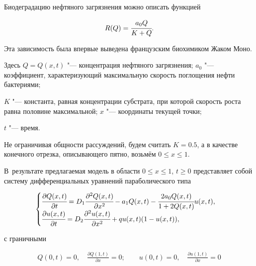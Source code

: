 Биодеградацию нефтяного загрязнения можно описать функцией  \cite[c.~18]{afa:bib9}

$$ R(Q) = \cfrac{a_0 Q}{K+Q}.$$ 

Эта зависимость была впервые выведена французским биохимиком Жаком Моно.

Здесь $Q =Q(x,t)$ "--- концентрация нефтяного загрязнения; $a_0$ "--- коэффициент, характеризующий максимальную скорость поглощения нефти бактериями;

$K$ "--- константа, равная концентрации субстрата, при которой скорость роста равна половине максимальной; $x$ "--- координаты текущей точки; 

$t$ "--- время. 

Не ограничивая общности рассуждений, будем  считать $K=0.5$, а в качестве конечного отрезка, описывающего пятно, возьмём $0\leqslant x \leqslant 1$.

В~результате предлагаемая модель в области $0\le x\le 1$, $t\ge 0$ представляет собой систему дифференциальных уравнений параболического типа

\begin{equation}

\label{afa:eq4}

\begin{cases}

\cfrac{\partial Q(x,t)}{\partial t}=D_1 \cfrac{\partial ^2Q(x,t)}{\partial

x^2}-a_1 Q(x,t)-\cfrac{2a_0 Q(x,t)}{1+2Q(x,t)}u(x,t), \\

\cfrac{\partial u(x,t)}{\partial t}=D_2 \cfrac{\partial ^2u(x,t)}{\partial

x^2}+qu(x,t)(1-u(x,t)),

\end{cases}

\end{equation}

с граничными

\begin{equation}

\label{afa:boundary}

\begin{array}{c}

\displaystyle Q(0, t)=0, \quad \frac{\partial Q(1,t)}{\partial x}=0; \qquad 

\displaystyle u(0, t)=0, \quad \frac{\partial u(1,t)}{\partial x}=0

\end{array}

\end{equation}

